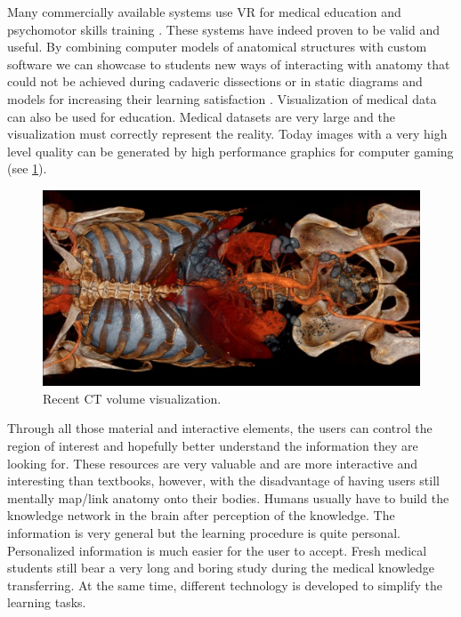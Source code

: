 Many commercially available systems use VR for medical education and psychomotor skills training \cite{Lu2005,Basdogan2007}. These systems have indeed proven to be valid and useful.
By combining computer models of anatomical structures with custom software we can showcase to students new ways of interacting with anatomy that could not be achieved during cadaveric dissections or in static diagrams and models for increasing their learning satisfaction \cite{Bacca2014}. 
Visualization of medical data can also be used for education. Medical datasets are very large and the visualization must correctly represent the reality. Today images with a very high level quality can be generated by high performance graphics for computer gaming (see \figurename{\ref{fig:2-bg:CTRendering}}).  
\begin{figure}
\centering  %
\includegraphics[width=0.8\linewidth]{figures/2-bg/CTRendering}
\caption{Recent CT volume visualization.}
\label{fig:2-bg:CTRendering}
\end{figure}

Through all those material and interactive elements, the users can control the region of interest and hopefully better understand the information they are looking for. 
These resources are very valuable and are more interactive and interesting than textbooks, however, with the disadvantage of having users still mentally map/link anatomy onto their bodies.
Humans usually have to build the knowledge network in the brain after perception of the knowledge. The information is very general but the learning procedure is quite personal. Personalized information is much easier for the user to accept.
Fresh medical students still bear a very long and boring study during the medical knowledge transferring.
At the same time, different technology is developed to simplify the learning tasks.

